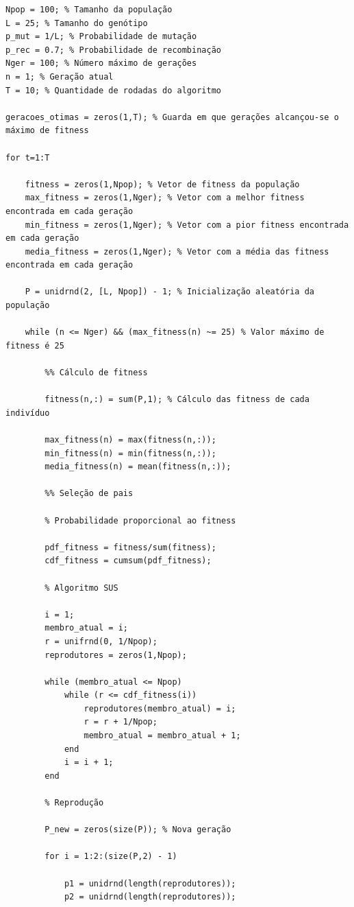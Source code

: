 \documentclass{report}
\begin{document}
	\begin{lstlisting}
Npop = 100; % Tamanho da população
L = 25; % Tamanho do genótipo
p_mut = 1/L; % Probabilidade de mutação
p_rec = 0.7; % Probabilidade de recombinação
Nger = 100; % Número máximo de gerações
n = 1; % Geração atual
T = 10; % Quantidade de rodadas do algoritmo

geracoes_otimas = zeros(1,T); % Guarda em que gerações alcançou-se o máximo de fitness

for t=1:T

    fitness = zeros(1,Npop); % Vetor de fitness da população
    max_fitness = zeros(1,Nger); % Vetor com a melhor fitness encontrada em cada geração
    min_fitness = zeros(1,Nger); % Vetor com a pior fitness encontrada em cada geração
    media_fitness = zeros(1,Nger); % Vetor com a média das fitness encontrada em cada geração

    P = unidrnd(2, [L, Npop]) - 1; % Inicialização aleatória da população

    while (n <= Nger) && (max_fitness(n) ~= 25) % Valor máximo de fitness é 25
        
        %% Cálculo de fitness
        
        fitness(n,:) = sum(P,1); % Cálculo das fitness de cada indivíduo

        max_fitness(n) = max(fitness(n,:));
        min_fitness(n) = min(fitness(n,:));
        media_fitness(n) = mean(fitness(n,:));

        %% Seleção de pais

        % Probabilidade proporcional ao fitness

        pdf_fitness = fitness/sum(fitness);
        cdf_fitness = cumsum(pdf_fitness);
        
        % Algoritmo SUS

        i = 1;
        membro_atual = i;
        r = unifrnd(0, 1/Npop);    
        reprodutores = zeros(1,Npop);

        while (membro_atual <= Npop)
            while (r <= cdf_fitness(i))
                reprodutores(membro_atual) = i;
                r = r + 1/Npop;
                membro_atual = membro_atual + 1; 
            end
            i = i + 1;
        end

        % Reprodução

        P_new = zeros(size(P)); % Nova geração

        for i = 1:2:(size(P,2) - 1)
            
            p1 = unidrnd(length(reprodutores));
            p2 = unidrnd(length(reprodutores));


\end{lstlisting}
\end{document}
